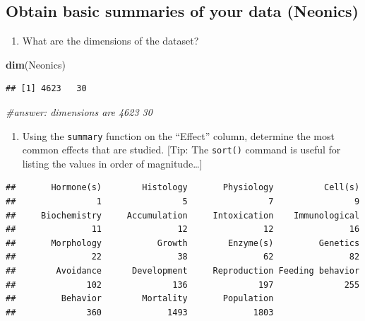 \documentclass[
]{article}
\newenvironment{Shaded}{\begin{snugshade}}{\end{snugshade}}
\newcommand{\CommentTok}[1]{\textcolor[rgb]{0.56,0.35,0.01}{\textit{#1}}}
\newcommand{\FunctionTok}[1]{\textcolor[rgb]{0.13,0.29,0.53}{\textbf{#1}}}
\newcommand{\NormalTok}[1]{#1}
\newcommand{\SpecialCharTok}[1]{\textcolor[rgb]{0.81,0.36,0.00}{\textbf{#1}}}
\providecommand{\tightlist}{%
  \setlength{\itemsep}{0pt}\setlength{\parskip}{0pt}}
\begin{document}
\subsection{Obtain basic summaries of your data
(Neonics)}\label{obtain-basic-summaries-of-your-data-neonics}

\begin{enumerate}
\def\labelenumi{\arabic{enumi}.}
\setcounter{enumi}{4}
\tightlist
\item
  What are the dimensions of the dataset?
\end{enumerate}

\begin{Shaded}
\begin{Highlighting}[]
\FunctionTok{dim}\NormalTok{(Neonics)}
\end{Highlighting}
\end{Shaded}

\begin{verbatim}
## [1] 4623   30
\end{verbatim}

\begin{Shaded}
\begin{Highlighting}[]
\CommentTok{\#answer: dimensions are 4623    30 }
\end{Highlighting}
\end{Shaded}

\begin{enumerate}
\def\labelenumi{\arabic{enumi}.}
\setcounter{enumi}{5}
\tightlist
\item
  Using the \texttt{summary} function on the ``Effect'' column,
  determine the most common effects that are studied. {[}Tip: The
  \texttt{sort()} command is useful for listing the values in order of
  magnitude\ldots{]}
\end{enumerate}

\begin{Shaded}
\end{Shaded}

\begin{verbatim}
##       Hormone(s)        Histology       Physiology          Cell(s) 
##                1                5                7                9 
##     Biochemistry     Accumulation     Intoxication    Immunological 
##               11               12               12               16 
##       Morphology           Growth        Enzyme(s)         Genetics 
##               22               38               62               82 
##        Avoidance      Development     Reproduction Feeding behavior 
##              102              136              197              255 
##         Behavior        Mortality       Population 
##              360             1493             1803
\end{verbatim}
\end{document}
